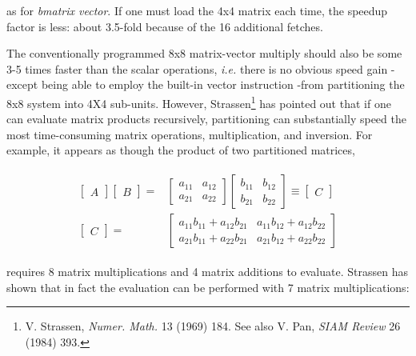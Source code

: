 as for \textit{bmatrix vector}. If one must load the 4x4 matrix each time, the speedup factor is less: about 3.5-fold because of the 16 additional fetches.

The conventionally programmed 8x8 matrix-vector multiply should also be some 3-5 times faster than the scalar operations, \textit{i.e.} there is no obvious speed gain -except being able to employ the built-in vector instruction  -from partitioning the 8x8 system into 4X4 sub-units. However, Strassen\footnote{V. Strassen, \textit{Numer. Math.} 13 (1969) 184. See also V. Pan, \textit{SIAM Review} 26 (1984) 393.} has pointed out that if one can evaluate matrix products recursively, partitioning can substantially speed the most time-consuming matrix operations, multiplication, and inversion. For example, it appears as though the product of two partitioned matrices,

\begin{align}
\begin{split}
    \begin{bmatrix}A\end{bmatrix}
    \begin{bmatrix}B\end{bmatrix} =& 
    \begin{bmatrix}
      a_{11} & a_{12} \\
      a_{21} & a_{22}
    \end{bmatrix}
    \begin{bmatrix}
      b_{11} & b_{12} \\
      b_{21} & b_{22}
    \end{bmatrix}
    \equiv
    \begin{bmatrix}C\end{bmatrix} \\
    \begin{bmatrix}C\end{bmatrix} =&
    \begin{bmatrix}
      a_{11}b_{11}+a_{12}b_{21} & a_{11}b_{12}+a_{12}b_{22} \\
      a_{21}b_{11}+a_{22}b_{21} & a_{21}b_{12}+a_{22}b_{22}
    \end{bmatrix}
\end{split}
\end{align}

requires 8 matrix multiplications and 4 matrix additions to evaluate. Strassen has shown that in fact the evaluation can be performed with 7 matrix multiplications:

